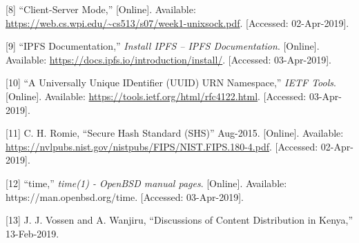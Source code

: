 \documentclass{article}
\begin{document}
[8] ``Client-Server Mode,'' [Online]. Available:
\url{https://web.cs.wpi.edu/~cs513/s07/week1-unixsock.pdf}. [Accessed:
02-Apr-2019].

[9] ``IPFS Documentation,'' \textit{Install IPFS – IPFS Documentation}. [Online]. Available: \url{https://docs.ipfs.io/introduction/install/}. [Accessed: 03-Apr-2019]. 

[10] ``A Universally Unique IDentifier (UUID) URN Namespace,''
\textit{IETF Tools}. [Online]. Available:
\url{https://tools.ietf.org/html/rfc4122.html}. [Accessed:
03-Apr-2019].

[11] C. H. Romie, ``Secure Hash Standard (SHS)'' Aug-2015. [Online]. Available: \url{https://nvlpubs.nist.gov/nistpubs/FIPS/NIST.FIPS.180-4.pdf}. [Accessed: 02-Apr-2019].

[12] ``time,'' \textit{time(1) - OpenBSD manual pages}. [Online]. Available: https://man.openbsd.org/time. [Accessed: 03-Apr-2019].

[13] J. J. Vossen and A. Wanjiru, ``Discussions of Content Distribution in Kenya,'' 13-Feb-2019. 
\end{document}
